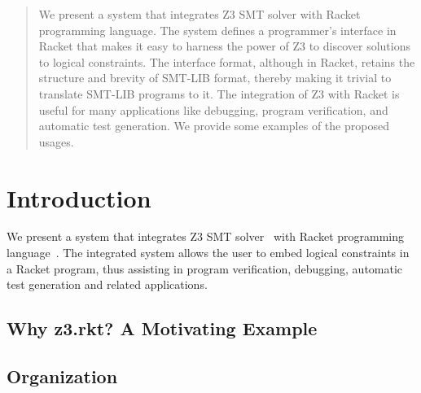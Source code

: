 \begin{abstract}
 We present a system that integrates Z3 SMT solver with
 Racket programming language. The system defines a programmer's
 interface in Racket that makes it easy to harness the power
 of Z3 to discover solutions to logical constraints. The
 interface format, although in Racket, retains the structure
 and brevity of SMT-LIB format, thereby making it trivial to
 translate SMT-LIB programs to it. The integration of Z3
 with Racket is useful for many applications like debugging,
 program verification, and automatic test generation. We
 provide some examples of the proposed usages.
\end{abstract}
\section{Introduction}
We present a system that integrates Z3 SMT solver~\cite{z3} with
Racket programming language~\cite{racket}. The integrated
system allows the user to embed logical constraints in a
Racket program, thus assisting in program verification,
debugging, automatic test generation and related
applications.

\subsection{Why z3.rkt? A Motivating Example}


\subsection{Organization}
